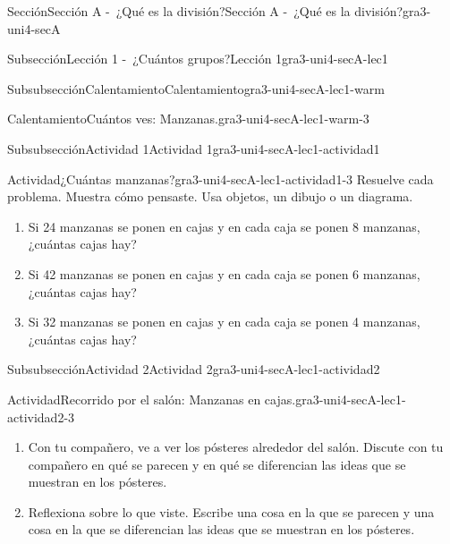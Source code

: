 \documentclass[twoside,10pt,]{article}
\begin{document}
\begin{sectionptx}{Sección}{Sección A -~¿Qué es la división?}{}{Sección A -~¿Qué es la división?}{}{}{gra3-uni4-secA}
\begin{subsectionptx}{Subsección}{Lección 1 -~¿Cuántos grupos?}{}{Lección 1}{}{}{gra3-uni4-secA-lec1}
\begin{subsubsectionptx}{Subsubsección}{Calentamiento}{}{Calentamiento}{}{}{gra3-uni4-secA-lec1-warm}
\begin{exploration}{Calentamiento}{Cuántos ves: Manzanas.}{gra3-uni4-secA-lec1-warm-3}
\begin{image}{0}{1}{0}{}
\end{image}%
\end{exploration}%
\end{subsubsectionptx}
%
%
\typeout{************************************************}
\typeout{************************************************}
%
\begin{subsubsectionptx}{Subsubsección}{Actividad 1}{}{Actividad 1}{}{}{gra3-uni4-secA-lec1-actividad1}
\begin{activity}{Actividad}{¿Cuántas manzanas?}{gra3-uni4-secA-lec1-actividad1-3}%
Resuelve cada problema. Muestra cómo pensaste. Usa objetos, un dibujo o un diagrama.%
\par
%
\begin{enumerate}
\item{}Si 24 manzanas se ponen en cajas y en cada caja se ponen 8 manzanas, ¿cuántas cajas hay?%
\item{}Si 42 manzanas se ponen en cajas y en cada caja se ponen 6 manzanas, ¿cuántas cajas hay?%
\item{}Si 32 manzanas se ponen en cajas y en cada caja se ponen 4 manzanas, ¿cuántas cajas hay?%
\end{enumerate}
%
\end{activity}%
\end{subsubsectionptx}
%
%
\typeout{************************************************}
\typeout{************************************************}
%
\begin{subsubsectionptx}{Subsubsección}{Actividad 2}{}{Actividad 2}{}{}{gra3-uni4-secA-lec1-actividad2}
\begin{activity}{Actividad}{Recorrido por el salón: Manzanas en cajas.}{gra3-uni4-secA-lec1-actividad2-3}%
%
\begin{enumerate}
\item{}Con tu compañero, ve a ver los pósteres alrededor del salón. Discute con tu compañero en qué se parecen y en qué se diferencian las ideas que se muestran en los pósteres.%
\item{}Reflexiona sobre lo que viste. Escribe una cosa en la que se parecen y una cosa en la que se diferencian las ideas que se muestran en los pósteres.%
\end{enumerate}
%
\end{activity}%
\end{subsubsectionptx}
%
%
\typeout{************************************************}

\end{subsectionptx}
\end{sectionptx}
\end{document}
